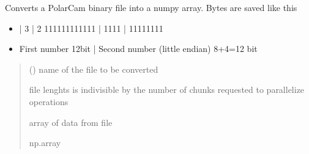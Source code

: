 \documentclass[letterpaper,10pt,english]{sphinxmanual}
\begin{document}
\begin{fulllineitems}
\label{\detokenize{micropolarray.processing:micropolarray.processing.convert.nparr_from_binary}}
\pysigstartsignatures
{}
\pysigstopsignatures
\sphinxAtStartPar
Converts a PolarCam binary file into a numpy array. Bytes are saved like this
\begin{itemize}
\item {} \begin{description}
             |   3                |     2
111111111111       | 1111               | 11111111

\end{description}

\item {} \begin{description}
\sphinxAtStartPar
First number 12bit | Second number (little endian) 8+4=12 bit

\end{description}

\end{itemize}
\begin{quote}\begin{description}
\sphinxAtStartPar
{} () \textendash{} name of the file to be converted

\sphinxAtStartPar
{} \textendash{} file lenghts is indivisible by the number of chunks requested to parallelize operations

\sphinxAtStartPar
array of data from file

\sphinxAtStartPar
np.array

\end{description}\end{quote}

\end{fulllineitems}

\end{document}
